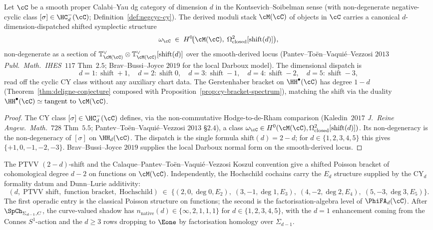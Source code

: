 \begin{proposition}
\label{prop:cy-cat-ptvv-shift}
Let $\cC$ be a smooth proper Calabi--Yau dg category of dimension $d$
in the Kontsevich--Soibelman sense (with non-degenerate negative-cyclic
class $[\sigma] \in \HC^-_d(\cC)$; Definition~\ref{def:negcyc-cy}).
The derived moduli stack $\cM(\cC)$ of objects in $\cC$ carries a
canonical $d$-dimension-dispatched shifted symplectic structure
\[
 \omega_\cC \;\in\; H^0\!\bigl(\cM(\cC),\;
 \Omega^2_{\mathrm{closed}}[\mathrm{shift}(d)]\bigr),
\]
non-degenerate as a section of $\mathbb T_{\cM(\cC)}^\vee
\otimes \mathbb T_{\cM(\cC)}^\vee[\mathrm{shift}(d)]$ over the
smooth-derived locus
(Pantev--To\"en--Vaqui\'e--Vezzosi $2013$ \emph{Publ.~Math.~IHES}~$117$
Thm~$2.5$; Brav--Bussi--Joyce $2019$ for the local Darboux model). The
dimensional dispatch is
\[
 d = 1\colon\;\text{shift}\;+1,\quad
 d = 2\colon\;\text{shift}\;0,\quad
 d = 3\colon\;\text{shift}\;-1,\quad
 d = 4\colon\;\text{shift}\;-2,\quad
 d = 5\colon\;\text{shift}\;-3,
\]
read off the cyclic CY class without any auxiliary chart data. The
Gerstenhaber bracket on $\HH^\bullet(\cC)$ has degree $1-d$
(Theorem~\ref{thm:deligne-conjecture} composed with
Proposition~\ref{prop:cy-bracket-spectrum}), matching the shift via
the duality $\HH^\bullet(\cC) \simeq \mathrm{tangent\ to\ }\cM(\cC)$.
\end{proposition}

\begin{proof}
The CY class $[\sigma] \in \HC^-_d(\cC)$ defines, via the
non-commutative Hodge-to-de-Rham comparison
(Kaledin~$2017$ \emph{J.~Reine Angew.~Math.}~$728$ Thm~$5.5$;
Pantev--To\"en--Vaqui\'e--Vezzosi $2013$ \S$2.4$), a class
$\omega_\cC \in H^0(\cM(\cC), \Omega^2_{\mathrm{closed}}[\mathrm{shift}(d)])$.
Its non-degeneracy is the non-degeneracy of $[\sigma]$ on
$\HH_d(\cC)$. The dispatch is the single formula
$\mathrm{shift}(d)=2-d$; for $d \in \{1,2,3,4,5\}$ this gives
$\{+1,0,-1,-2,-3\}$. Brav--Bussi--Joyce $2019$
supplies the local Darboux normal form on the smooth-derived locus.
\end{proof}

\begin{remark}
\label{rem:cy-cat-shift-law-level-0}
The PTVV $(2-d)$-shift and the Calaque--Pantev--To\"en--Vaqui\'e--Vezzosi
Koszul convention give a shifted Poisson bracket of cohomological degree \(d-2\) on functions on
$\cM(\cC)$. Independently, the Hochschild cochains carry the $E_d$
structure supplied by the CY$_d$ formality datum and Dunn--Lurie
additivity:
\[
 (d,\;\text{PTVV shift},\;\text{function bracket},\;\text{Hochschild})
 \;\in\;
 \bigl\{(2,0,\deg 0,E_2),\;(3,-1,\deg 1,E_3),\;(4,-2,\deg 2,E_4),\;(5,-3,\deg 3,E_5)\bigr\}.
\]
The first operadic entry is the classical Poisson structure on
functions; the second is the factorisation-algebra level of
$\PhiFA_d(\cC)$. After $\SpCh_{\Sigma_{d-1},C}$, the curve-valued
shadow has $n_{\mathrm{native}}(d)\in\{\infty,2,1,1,1\}$ for
$d\in\{1,2,3,4,5\}$, with the $d=1$ enhancement coming from the
Connes $S^1$-action and the $d\geq3$ rows dropping to $\Eone$ by
factorisation homology over $\Sigma_{d-1}$.
\end{remark}

